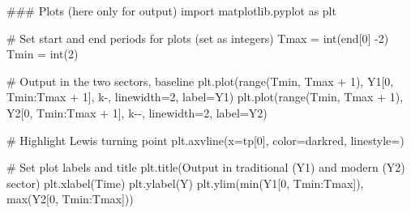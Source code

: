 \documentclass[
  letterpaper,
  DIV=11,
  numbers=noendperiod]{scrreprt}
\newenvironment{Shaded}{\begin{snugshade}}{\end{snugshade}}
\newcommand{\BuiltInTok}[1]{\textcolor[rgb]{0.00,0.23,0.31}{#1}}
\newcommand{\CommentTok}[1]{\textcolor[rgb]{0.37,0.37,0.37}{#1}}
\newcommand{\DecValTok}[1]{\textcolor[rgb]{0.68,0.00,0.00}{#1}}
\newcommand{\ImportTok}[1]{\textcolor[rgb]{0.00,0.46,0.62}{#1}}
\newcommand{\NormalTok}[1]{\textcolor[rgb]{0.00,0.23,0.31}{#1}}
\newcommand{\OperatorTok}[1]{\textcolor[rgb]{0.37,0.37,0.37}{#1}}
\newcommand{\StringTok}[1]{\textcolor[rgb]{0.13,0.47,0.30}{#1}}
\begin{document}
\begin{tcolorbox}[enhanced jigsaw, titlerule=0mm, breakable, bottomrule=.15mm, toprule=.15mm, colbacktitle=quarto-callout-note-color!10!white, rightrule=.15mm, toptitle=1mm, opacityback=0, left=2mm, coltitle=black, title=\textcolor{quarto-callout-note-color}{\faInfo}\hspace{0.5em}{Python code}, colframe=quarto-callout-note-color-frame, opacitybacktitle=0.6, leftrule=.75mm, bottomtitle=1mm, arc=.35mm, colback=white]

\begin{Shaded}
\begin{Highlighting}[]
\CommentTok{\#\#\# Plots (here only for output)}
\ImportTok{import}\NormalTok{ matplotlib.pyplot }\ImportTok{as}\NormalTok{ plt}

\CommentTok{\# Set start and end periods for plots (set as integers)}
\NormalTok{Tmax }\OperatorTok{=} \BuiltInTok{int}\NormalTok{(end[}\DecValTok{0}\NormalTok{] }\OperatorTok{{-}}\DecValTok{2}\NormalTok{)}
\NormalTok{Tmin }\OperatorTok{=} \BuiltInTok{int}\NormalTok{(}\DecValTok{2}\NormalTok{)}

\CommentTok{\# Output in the two sectors, baseline}
\NormalTok{plt.plot(}\BuiltInTok{range}\NormalTok{(Tmin, Tmax }\OperatorTok{+} \DecValTok{1}\NormalTok{), Y1[}\DecValTok{0}\NormalTok{, Tmin:Tmax }\OperatorTok{+} \DecValTok{1}\NormalTok{], }\StringTok{\textquotesingle{}k{-}\textquotesingle{}}\NormalTok{, linewidth}\OperatorTok{=}\DecValTok{2}\NormalTok{, label}\OperatorTok{=}\StringTok{\textquotesingle{}Y1\textquotesingle{}}\NormalTok{)}
\NormalTok{plt.plot(}\BuiltInTok{range}\NormalTok{(Tmin, Tmax }\OperatorTok{+} \DecValTok{1}\NormalTok{), Y2[}\DecValTok{0}\NormalTok{, Tmin:Tmax }\OperatorTok{+} \DecValTok{1}\NormalTok{], }\StringTok{\textquotesingle{}k{-}{-}\textquotesingle{}}\NormalTok{, linewidth}\OperatorTok{=}\DecValTok{2}\NormalTok{, label}\OperatorTok{=}\StringTok{\textquotesingle{}Y2\textquotesingle{}}\NormalTok{)}

\CommentTok{\# Highlight Lewis turning point}
\NormalTok{plt.axvline(x}\OperatorTok{=}\NormalTok{tp[}\DecValTok{0}\NormalTok{], color}\OperatorTok{=}\StringTok{\textquotesingle{}darkred\textquotesingle{}}\NormalTok{, linestyle}\OperatorTok{=}\StringTok{\textquotesingle{}{-}\textquotesingle{}}\NormalTok{)}

\CommentTok{\# Set plot labels and title}
\NormalTok{plt.title(}\StringTok{\textquotesingle{}Output in traditional (Y1) and modern (Y2) sector\textquotesingle{}}\NormalTok{)}
\NormalTok{plt.xlabel(}\StringTok{\textquotesingle{}Time\textquotesingle{}}\NormalTok{)}
\NormalTok{plt.ylabel(}\StringTok{\textquotesingle{}Y\textquotesingle{}}\NormalTok{)}
\NormalTok{plt.ylim(}\BuiltInTok{min}\NormalTok{(Y1[}\DecValTok{0}\NormalTok{, Tmin:Tmax]), }\BuiltInTok{max}\NormalTok{(Y2[}\DecValTok{0}\NormalTok{, Tmin:Tmax]))}


\end{Highlighting}
\end{Shaded}
\end{tcolorbox}
\end{document}
